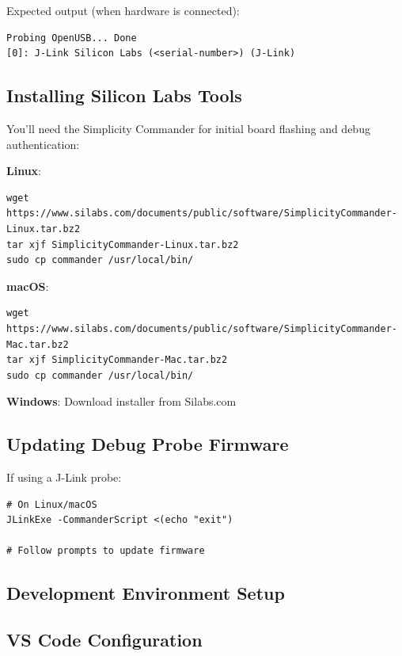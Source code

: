 Expected output (when hardware is connected):

\begin{verbatim}
Probing OpenUSB... Done
[0]: J-Link Silicon Labs (<serial-number>) (J-Link)
\end{verbatim}

\subsection{Installing Silicon Labs Tools}
\label{subsec:install-silabs-tools}

You'll need the Simplicity Commander for initial board flashing and debug authentication:

\textbf{Linux}:
\begin{verbatim}
wget https://www.silabs.com/documents/public/software/SimplicityCommander-Linux.tar.bz2
tar xjf SimplicityCommander-Linux.tar.bz2
sudo cp commander /usr/local/bin/
\end{verbatim}

\textbf{macOS}:
\begin{verbatim}
wget https://www.silabs.com/documents/public/software/SimplicityCommander-Mac.tar.bz2
tar xjf SimplicityCommander-Mac.tar.bz2
sudo cp commander /usr/local/bin/
\end{verbatim}

\textbf{Windows}: Download installer from Silabs.com

\subsection{Updating Debug Probe Firmware}
\label{subsec:update-firmware}

If using a J-Link probe:

\begin{verbatim}
# On Linux/macOS
JLinkExe -CommanderScript <(echo "exit")

# Follow prompts to update firmware
\end{verbatim}

\subsection{Development Environment Setup}
\label{sec:dev-env-setup}

\subsection{VS Code Configuration}
\label{subsec:vscode-setup}

